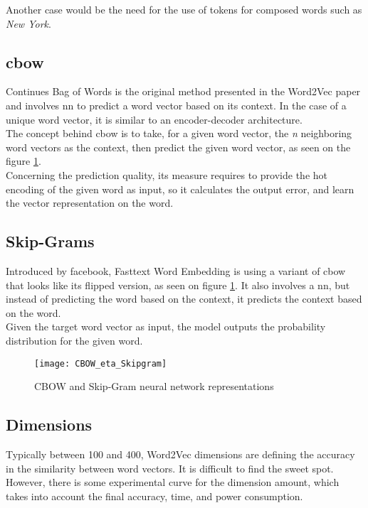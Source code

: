 Another case would be the need for the use of tokens for composed words such as \textit{New York}.


\subsection{\gls{cbow}}
\label{analyse:cbow}
Continues Bag of Words is the original method presented in the Word2Vec paper \cite{article:word2vec}  and involves \gls{nn} to predict a word vector based on its context. In the case of a unique word vector, it is similar to an encoder-decoder architecture.\\

The concept behind \gls{cbow} is to take, for a given word vector, the \textit{n} neighboring word vectors as the context, then predict the given word vector, as seen on the figure \ref{fig:wikipedia_cbow_skipgram_img}.\\

Concerning the prediction quality, its measure requires to provide the hot encoding of the given word as input, so it calculates the output error, and learn the vector representation on the word.

\subsection{Skip-Grams}
\label{analyse:skip-grams}
Introduced by facebook, Fasttext\cite{article:fasttext} Word Embedding is using a variant of \gls{cbow} that looks like its flipped version, as seen on figure \ref{fig:wikipedia_cbow_skipgram_img}. It also involves a \gls{nn}, but instead of predicting the word based on the context, it predicts the context based on the word.\\

Given the target word vector as input, the model outputs the probability distribution for the given word.

\begin{figure}[ht!]
    \centering
    \texttt{[image: CBOW\_eta\_Skipgram]}
    \caption{
       CBOW and Skip-Gram neural network representations\cite{wikipedia:cbow_skipgram_img}
    }
    \label{fig:wikipedia_cbow_skipgram_img}
\end{figure}

\subsection{Dimensions}
\label{analyse:dimensions}
Typically between 100 and 400, Word2Vec dimensions are defining the accuracy in the similarity between word vectors. It is difficult to find the sweet spot. However, there is some experimental curve for the dimension amount, which takes into account the final accuracy, time, and power consumption. 

